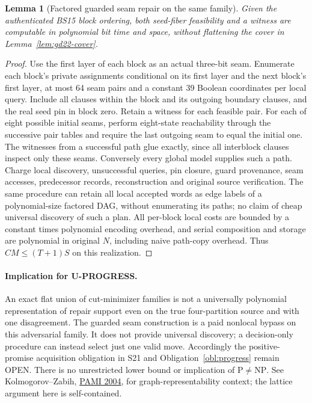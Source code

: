 \documentclass[11pt]{article}
\newtheorem{lemma}[theorem]{Lemma}
\begin{document}
\begin{lemma}[Factored guarded seam repair on the same family]\label{lem:gd22-seam}
Given the authenticated BS15 block ordering, both seed-fiber feasibility and a witness are computable in polynomial bit time and space, without flattening the cover in Lemma~\ref{lem:gd22-cover}.
\end{lemma}
\begin{proof}
Use the first layer of each block as an actual three-bit seam. Enumerate each block's private assignments conditional on its first layer and the next block's first layer, at most 64 seam pairs and a constant 39 Boolean coordinates per local query. Include all clauses within the block and its outgoing boundary clauses, and the real seed pin in block zero. Retain a witness for each feasible pair. For each of eight possible initial seams, perform eight-state reachability through the successive pair tables and require the last outgoing seam to equal the initial one. The witnesses from a successful path glue exactly, since all interblock clauses inspect only these seams. Conversely every global model supplies such a path. Charge local discovery, unsuccessful queries, pin closure, guard provenance, seam accesses, predecessor records, reconstruction and original source verification. The same procedure can retain all local accepted words as edge labels of a polynomial-size factored DAG, without enumerating its paths; no claim of cheap universal discovery of such a plan. All per-block local costs are bounded by a constant times polynomial encoding overhead, and serial composition and storage are polynomial in original $N$, including naive path-copy overhead. Thus $CM\le(T+1)S$ on this realization.
\end{proof}

\paragraph{Implication for U-PROGRESS.}
An exact flat union of cut-minimizer families is not a universally polynomial representation of repair support even on the true four-partition source and with one disagreement. The guarded seam construction is a paid nonlocal bypass on this adversarial family. It does not provide universal discovery; a decision-only procedure can instead select just one valid move. Accordingly the positive-promise acquisition obligation in S21 and Obligation~\ref{obl:progress} remain OPEN. There is no unrestricted lower bound or implication of $\mathrm P\ne\mathrm{NP}$. See Kolmogorov--Zabih, \href{https://doi.org/10.1109/TPAMI.2004.1262177}{PAMI 2004}, for graph-representability context; the lattice argument here is self-contained.
\end{document}
